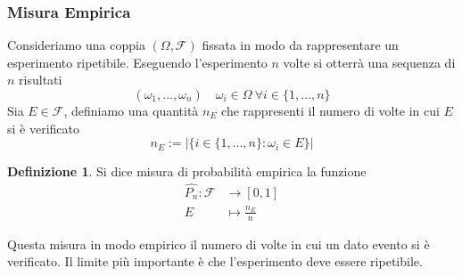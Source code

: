 \documentclass{article}
\theoremstyle{plain}
\theoremstyle{definition}
\newtheorem{definizione}{Definizione}[section]
\theoremstyle{remark}
\begin{document}
\subsubsection{Misura Empirica} %
\label{subs:misura_empirica}
Consideriamo una coppia $(\Omega,\mathcal{F})$ fissata in modo da rappresentare un esperimento ripetibile. Eseguendo l'esperimento $n$ volte si otterrà una sequenza di $n$ risultati
\begin{equation*}
	(\omega_1,...,\omega_n)\quad \omega_i\in\Omega\ \forall i\in\{1,...,n\}
\end{equation*}
Sia $E\in\mathcal{F}$, definiamo una quantità $n_E$ che rappresenti il numero di volte in cui $E$ si è verificato
\begin{equation*}
	n_E:=\lvert\{i\in\{1,...,n\}:\omega_i\in E\}\rvert
\end{equation*}
\begin{definizione}
	Si dice misura di probabilità empirica la funzione
	\begin{align*}
		\hat{P_n}:\mathcal{F}&\to[0,1]\\
		E&\mapsto\frac{n_E}{n}
	\end{align*}
\end{definizione}
Questa misura in modo empirico il numero di volte in cui un dato evento si è verificato. Il limite più importante è che l'esperimento deve essere ripetibile.
\end{document}
